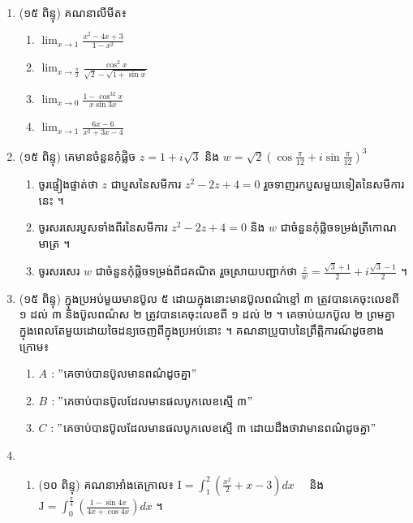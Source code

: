 \documentclass{officialexam}
\begin{document}
\newpage
	{\maketitle}\\
	\begin{enumerate}[I]
		\item {\color{khtug}(១៥ ពិន្ទុ)} គណនាលីមីត៖
		\begin{enumerate}[k,4]
			\item $\lim_{x\to1}\frac{x^2-4x+3}{1-x^2}$
			\item $\lim_{x\to\frac{\pi}{2}}\frac{\cos^2x}{\sqrt{2}-\sqrt{1+\sin x}}$
			\item $\lim_{x\to0}\frac{1-\cos^32x}{x\sin3x}$
			\item $\lim_{x\to1}\frac{6x-6}{x^2+3x-4}$
		\end{enumerate}
		\item {\color{khtug}(១៥ ពិន្ទុ)} គេមានចំនួនកុំផ្លិច $z=1+i\sqrt{3}$ និង $w=\sqrt{2}\left(\cos\frac{\pi}{12}+i\sin\frac{\pi}{12}\right)^3$
		\begin{enumerate}[k]
			\item ចូរផ្ទៀងផ្ទាត់ថា $z$ ជាប្ញសនៃសមីការ $z^2-2z+4=0$ រួចទាញរកប្ញសមួយទៀតនៃសមីការនេះ ។
			\item ចូរសរសេរប្ញសទាំងពីរនៃសមីការ $z^2-2z+4=0$ និង $w$ ជាចំនួនកុំផ្លិចទម្រង់ត្រីកោណមាត្រ ។ 
			\item ចូរសរសេរ $w$ ជាចំនួនកុំផ្លិចទម្រង់ពីជគណិត រួចស្រាយបញ្ជាក់ថា $\frac{z}{w}=\frac{\sqrt{3}+1}{2}+i\frac{\sqrt{3}-1}{2}$ ។
		\end{enumerate}
		\item {\color{khtug}(១៥ ពិន្ទុ)} ក្នុងប្រអប់មួយមានប៊ូល ៥ ដោយក្នុងនោះមានប៊ូលពណ៌ខ្មៅ ៣ ត្រូវបានគេចុះលេខពី ១ ដល់ ៣ និងប៊ូលពណ៌ស ២ ត្រូវបានគេចុះលេខពី ១ ដល់ ២ ។ គេចាប់យកប៊ូល ២ ព្រមគ្នាក្នុងពេលតែមួយដោយចៃដន្យចេញពីក្នុងប្រអប់នោះ ។ គណនាប្រូបាបនៃព្រឹត្តិការណ៍ដូចខាងក្រោម៖ 
		\begin{enumerate}[k]
			\item $A$ $ :"$គេចាប់បានប៊ូលមានពណ៌ដូចគ្នា$"$
			\item $B$ $ :"$គេចាប់បានប៊ូលដែលមានផលបូកលេខស្មើ ៣$"$ 
			\item $C$ $ :"$គេចាប់បានប៊ូលដែលមានផលបូកលេខស្មើ ៣ ដោយដឹងថាវាមានពណ៌ដូចគ្នា$"$ 
		\end{enumerate}
		\item \begin{enumerate}[1]
			\item {\color{khtug}(១០ ពិន្ទុ)} គណនាអាំងតេក្រាល៖ $\mathrm{I}=\int_{1}^{2}\left(\frac{x^2}{2}+x-3\right)dx$ ~~និង $\mathrm{J}=\int_{0}^{\frac{\pi}{4}}\left(\frac{1-\sin4x}{4x+\cos4x}\right)dx$ ។

\end{enumerate}
\end{enumerate}
\end{document}
